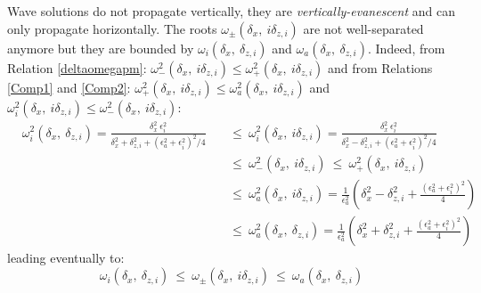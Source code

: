 \documentclass[a4paper,11pt]{article}
\begin{document}
Wave solutions do not propagate vertically, they are \textit{vertically-evanescent} and can only propagate horizontally. The roots $\omega_{\pm}(\delta_x,\ i\delta_{z,i})$ are not well-separated anymore but they are bounded by $\omega_{i}(\delta_x,\ \delta_{z,i})$ and $\omega_{a}(\delta_x,\ \delta_{z,i})$. Indeed,  from Relation \ref{deltaomegapm}: $\omega_{-}^2(\delta_x,\ i\delta_{z,i})\leq\omega_{+}^2(\delta_x,\ i\delta_{z,i})$ and from Relations \ref{Comp1} and \ref{Comp2}: $\omega_+^2(\delta_x,\ i\delta_{z,i})\leq\omega_a^2(\delta_x,\ i\delta_{z,i})$ and $\omega_i^2(\delta_x,\ i\delta_{z,i})\leq\omega_-^2(\delta_x,\ i\delta_{z,i})$:
\begin{subequations}
	\begin{alignat}{2}	
	\nonumber&\omega_{i}^2(\delta_x,\ \delta_{z,i})=
	\frac{\delta_x^2\ \epsilon_i^2}{\delta_x^2+\delta_{z,i}^2
	+(\epsilon_a^2+\epsilon_i^2)^2/4}
	&&\ \leq\  
	\omega_{i}^2(\delta_x,\ i\delta_{z,i})=
	\frac{\delta_x^2\ \epsilon_i^2}{\delta_x^2-\delta_{z,i}^2
	+(\epsilon_a^2+\epsilon_i^2)^2/4}\\[3mm]
	\nonumber& &&\ \leq\ \omega_-^2(\delta_x,\ i\delta_{z,i})\ \leq\ \omega_+^2(\delta_x,\ i\delta_{z,i})\\[3mm]
	\nonumber& &&\ \leq\  
	\omega_{a}^2(\delta_x,\ i\delta_{z,i})=\frac{1}{\epsilon_a^2}\left(
	\delta_x^2-\delta_{z,i}^2
	+\frac{(\epsilon_a^2+\epsilon_i^2)^2}{4}
	\right)\\[3mm]
	\nonumber& &&\ \leq\ 
	\omega_{a}^2(\delta_x,\ \delta_{z,i})=\frac{1}{\epsilon_a^2}\left(
	\delta_x^2+\delta_{z,i}^2
	+\frac{(\epsilon_a^2+\epsilon_i^2)^2}{4}
	\right)
	\end{alignat}
\end{subequations}
leading eventually to:
\begin{equation}
	\omega_{i}(\delta_x,\ \delta_{z,i})
	\ \leq\  
	\omega_{\pm}(\delta_x,\ i\delta_{z,i})
	\ \leq\ 
	\omega_{a}(\delta_x,\ \delta_{z,i})
	\label{RelInequal}
\end{equation}
\end{document}
